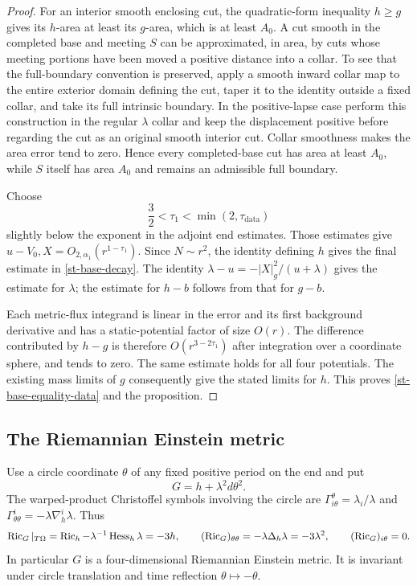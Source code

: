 \begin{proof}
For an interior smooth enclosing cut, the quadratic-form inequality
$h\geq g$ gives its $h$-area at least its $g$-area, which is at least
$A_0$.  A cut smooth in the completed base and meeting $S$ can be
approximated, in area, by cuts whose meeting portions have been moved
a positive distance into a collar.  To see that the full-boundary
convention is preserved, apply a smooth inward collar map to the
entire exterior domain defining the cut, taper it to the identity
outside a fixed collar, and take its full intrinsic boundary.  In the
positive-lapse case perform this construction in the regular
$\lambda$ collar and keep the displacement positive before regarding
the cut as an original smooth interior cut.  Collar smoothness makes
the area error tend to zero.  Hence every completed-base cut has area
at least $A_0$, while $S$ itself has area $A_0$ and remains an
admissible full boundary.

Choose
\[
 \frac32<\tau_1<\min(2,\tau_{\mathrm{data}})
\]
slightly below the exponent in the adjoint end estimates.  Those
estimates give $u-V_0,X=O_{2,\alpha_1}(r^{1-\tau_1})$.
Since $N\sim r^2$, the identity defining $h$ gives the final estimate
in \eqref{st-base-decay}.  The identity
$\lambda-u=-|X|_g^2/(u+\lambda)$ gives the estimate for $\lambda$;
the estimate for $h-b$ follows from that for $g-b$.

Each metric-flux integrand is linear in the error and its first
background derivative and has a static-potential factor of size
$O(r)$.  The difference contributed by $h-g$ is therefore
$O(r^{3-2\tau_1})$ after integration over a coordinate sphere, and
tends to zero.  The same estimate holds for all four potentials.
The existing mass limits of $g$ consequently give the stated limits
for $h$.  This proves \eqref{st-base-equality-data} and the proposition.
\end{proof}

\subsection{The Riemannian Einstein metric}

Use a circle coordinate $\theta$ of any fixed positive period on the
end and put
\begin{equation}
 G=h+\lambda^2d\theta^2.
 \label{st-wick-metric}
\end{equation}
The warped-product Christoffel symbols involving the circle are
$\Gamma^\theta_{i\theta}=\lambda_i/\lambda$ and
$\Gamma^i_{\theta\theta}=-\lambda\nabla_h^i\lambda$.  Thus
\begin{equation}
 \operatorname{Ric}_G|_{T\Omega}=\operatorname{Ric}_h-\lambda^{-1}\operatorname{Hess}_h\lambda=-3h,
 \qquad
 (\operatorname{Ric}_G)_{\theta\theta}=-\lambda\Delta_h\lambda=-3\lambda^2,
 \qquad (\operatorname{Ric}_G)_{i\theta}=0.
 \label{st-wick-einstein}
\end{equation}
In particular $G$ is a four-dimensional Riemannian Einstein metric.
It is invariant under circle translation and time reflection
$\theta\mapsto-\theta$.

